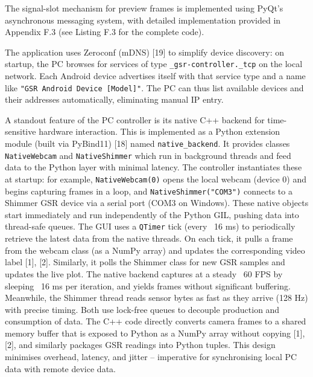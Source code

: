 The signal-slot mechanism for preview frames is implemented using PyQt's asynchronous messaging system, with detailed implementation provided in Appendix F.3 (see Listing F.3 for the complete code).

The application uses Zeroconf (mDNS) [19] to simplify device discovery: on startup, the PC browses for services of type \texttt{\_gsr-controller.\_tcp} on the local network. Each Android device advertises itself with that service type and a name like \texttt{"GSR Android Device [Model]"}. The PC can thus list available devices and their addresses automatically, eliminating manual IP entry.

A standout feature of the PC controller is its native C++ backend for time-sensitive hardware interaction. This is implemented as a Python extension module (built via PyBind11) [18] named \texttt{native\_backend}. It provides classes \texttt{NativeWebcam} and \texttt{NativeShimmer} which run in background threads and feed data to the Python layer with minimal latency. The controller instantiates these at startup: for example, \texttt{NativeWebcam(0)} opens the local webcam (device 0) and begins capturing frames in a loop, and \texttt{NativeShimmer("COM3")} connects to a Shimmer GSR device via a serial port (COM3 on Windows). These native objects start immediately and run independently of the Python GIL, pushing data into thread-safe queues. The GUI uses a \texttt{QTimer} tick (every ~16 ms) to periodically retrieve the latest data from the native threads. On each tick, it pulls a frame from the webcam class (as a NumPy array) and updates the corresponding video label [1], [2]. Similarly, it polls the Shimmer class for new GSR samples and updates the live plot. The native backend captures at a steady ~60 FPS by sleeping ~16 ms per iteration, and yields frames without significant buffering. Meanwhile, the Shimmer thread reads sensor bytes as fast as they arrive (128 Hz) with precise timing. Both use lock-free queues to decouple production and consumption of data. The C++ code directly converts camera frames to a shared memory buffer that is exposed to Python as a NumPy array without copying [1], [2], and similarly packages GSR readings into Python tuples. This design minimises overhead, latency, and jitter -- imperative for synchronising local PC data with remote device data.

